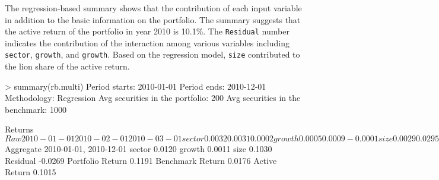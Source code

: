 The regression-based summary shows that the contribution of each input
variable in addition to the basic information on the portfolio. The
summary suggests that the active return of the portfolio in year 2010
is 10.1\%. The \texttt{Residual} number indicates the contribution
of the interaction among various variables including \texttt{sector},
\texttt{growth}, and \texttt{growth}. Based on the
regression model, \texttt{size} contributed to the lion share of the
active return.
\begin{smallverbatim}
> summary(rb.multi)
Period starts:                     2010-01-01
Period ends:                       2010-12-01
Methodology:                       Regression
Avg securities in the portfolio:   200
Avg securities in the benchmark:   1000

Returns 
$Raw
                 2010-01-01 2010-02-01 2010-03-01
sector               0.0032     0.0031     0.0002
growth               0.0005     0.0009    -0.0001
size                 0.0029     0.0295     0.0105
Residual             0.0081    -0.0172    -0.0302
Portfolio Return    -0.0291     0.0192     0.0298
Benchmark Return    -0.0438     0.0029     0.0494
Active Return        0.0147     0.0163    -0.0196
                 2010-04-01 2010-05-01 2010-06-01
sector               0.0016     0.0039     0.0070
growth               0.0001     0.0002     0.0004
size                 0.0135     0.0037     0.0018
Residual            -0.0040     0.0310     0.0183
Portfolio Return    -0.0080    -0.0381     0.0010
Benchmark Return    -0.0192    -0.0769    -0.0266
Active Return        0.0113     0.0388     0.0276
                 2010-07-01 2010-08-01 2010-09-01
sector               0.0016     0.0047    -0.0022
growth              -0.0005     0.0005    -0.0006
size                 0.0064     0.0000     0.0096
Residual            -0.0324     0.0173    -0.0220
Portfolio Return     0.0515    -0.0119     0.0393
Benchmark Return     0.0764    -0.0344     0.0545
Active Return       -0.0249     0.0225    -0.0152
                 2010-10-01 2010-11-01 2010-12-01
sector               0.0015    -0.0044    -0.0082
growth              -0.0010    -0.0004     0.0010
size                 0.0022     0.0130     0.0056
Residual             0.0137     0.0175    -0.0247
Portfolio Return     0.0414    -0.0036     0.0260
Benchmark Return     0.0249    -0.0293     0.0523
Active Return        0.0165     0.0257    -0.0263

$Aggregate
                 2010-01-01, 2010-12-01
sector                           0.0120
growth                           0.0011
size                             0.1030
Residual                        -0.0269
Portfolio Return                 0.1191
Benchmark Return                 0.0176
Active Return                    0.1015
\end{smallverbatim}

